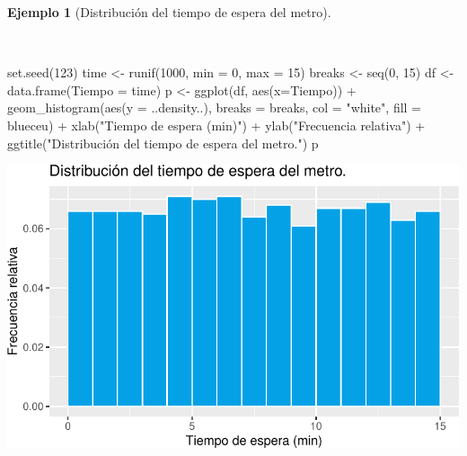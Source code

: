 \documentclass[
  a4paper,
]{scrreport}
\newenvironment{Shaded}{\begin{snugshade}}{\end{snugshade}}
\newcommand{\AttributeTok}[1]{\textcolor[rgb]{0.40,0.45,0.13}{#1}}
\newcommand{\DecValTok}[1]{\textcolor[rgb]{0.68,0.00,0.00}{#1}}
\newcommand{\FunctionTok}[1]{\textcolor[rgb]{0.28,0.35,0.67}{#1}}
\newcommand{\NormalTok}[1]{\textcolor[rgb]{0.00,0.23,0.31}{#1}}
\newcommand{\OtherTok}[1]{\textcolor[rgb]{0.00,0.23,0.31}{#1}}
\newcommand{\SpecialCharTok}[1]{\textcolor[rgb]{0.37,0.37,0.37}{#1}}
\newcommand{\StringTok}[1]{\textcolor[rgb]{0.13,0.47,0.30}{#1}}
\theoremstyle{plain}
\theoremstyle{definition}
\theoremstyle{definition}
\newtheorem{example}{Ejemplo}[chapter]
\theoremstyle{remark}
\begin{document}
\begin{example}[Distribución del tiempo de espera del
metro]\protect\hypertarget{exm-distribucion-tiempo-espera-metro}{}\label{exm-distribucion-tiempo-espera-metro}

~

\begin{Shaded}
\begin{Highlighting}[]
\FunctionTok{set.seed}\NormalTok{(}\DecValTok{123}\NormalTok{)}
\NormalTok{time }\OtherTok{\textless{}{-}} \FunctionTok{runif}\NormalTok{(}\DecValTok{1000}\NormalTok{, }\AttributeTok{min =} \DecValTok{0}\NormalTok{, }\AttributeTok{max =} \DecValTok{15}\NormalTok{)}
\NormalTok{breaks }\OtherTok{\textless{}{-}} \FunctionTok{seq}\NormalTok{(}\DecValTok{0}\NormalTok{, }\DecValTok{15}\NormalTok{)}
\NormalTok{df }\OtherTok{\textless{}{-}} \FunctionTok{data.frame}\NormalTok{(}\AttributeTok{Tiempo =}\NormalTok{ time)}
\NormalTok{p }\OtherTok{\textless{}{-}} \FunctionTok{ggplot}\NormalTok{(df, }\FunctionTok{aes}\NormalTok{(}\AttributeTok{x=}\NormalTok{Tiempo)) }\SpecialCharTok{+}
    \FunctionTok{geom\_histogram}\NormalTok{(}\FunctionTok{aes}\NormalTok{(}\AttributeTok{y =}\NormalTok{ ..density..), }\AttributeTok{breaks =}\NormalTok{ breaks, }\AttributeTok{col =} \StringTok{"white"}\NormalTok{, }\AttributeTok{fill =}\NormalTok{ blueceu) }\SpecialCharTok{+}
    \FunctionTok{xlab}\NormalTok{(}\StringTok{"Tiempo de espera (min)"}\NormalTok{) }\SpecialCharTok{+}
    \FunctionTok{ylab}\NormalTok{(}\StringTok{"Frecuencia relativa"}\NormalTok{) }\SpecialCharTok{+}
    \FunctionTok{ggtitle}\NormalTok{(}\StringTok{"Distribución del tiempo de espera del metro."}\NormalTok{)}
\NormalTok{p}
\end{Highlighting}
\end{Shaded}

\includegraphics{02-estadistica-descriptiva_files/figure-pdf/histograma-tiempo-espera-metro-1.pdf}

\end{example}
\end{document}

